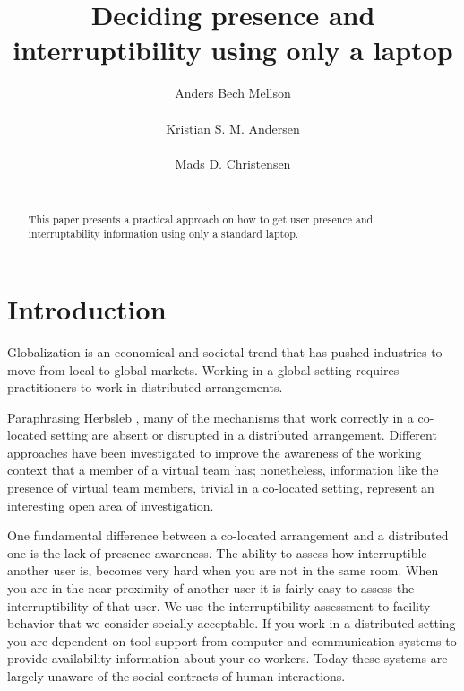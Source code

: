 \documentclass{sigchi}
\begin{document}
\title{Deciding presence and interruptibility using only a laptop}
\author{
  \alignauthor Anders Bech Mellson\\
    \\
  \alignauthor Kristian S. M. Andersen\\
    \\
  \alignauthor Mads D. Christensen\\
    \\
}

\maketitle

\begin{abstract}
This paper presents a practical approach on how to get user presence and interruptability information using only a standard laptop.
\end{abstract}



\section{Introduction}
Globalization is an economical and societal trend that has pushed industries to move from local to global markets.
Working in a global setting requires practitioners to work in distributed arrangements.

Paraphrasing Herbsleb \cite{herbsleb2007}, many of the mechanisms that work correctly in a co-located setting are absent or disrupted in a distributed arrangement.
Different approaches \cite{bly1993media} \cite{fogarty2004myvine} \cite{hincapie2011design} \cite{lai2003myteam} \cite{want1992active} have been investigated to improve the awareness of the working context that a member of a virtual team has; nonetheless, information like the presence of virtual team members, trivial in a co-located setting, represent an interesting open area of investigation.

One fundamental difference between a co-located arrangement and a distributed one is the lack of presence awareness.
The ability to assess how interruptible another user is, becomes very hard when you are not in the same room.
When you are in the near proximity of another user it is fairly easy to assess the interruptibility of that user.
We use the interruptibility assessment to facility behavior that we consider socially acceptable.
If you work in a distributed setting you are dependent on tool support from computer and communication systems to provide availability information about your co-workers.
Today these systems are largely unaware of the social contracts of human interactions.
\end{document}

